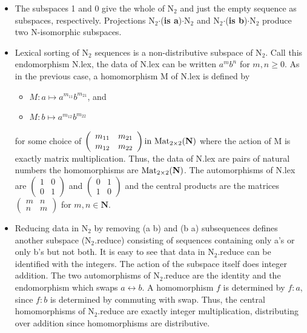 \documentclass[11pt]{article}
\begin{document}
\begin{itemize}
\item{The subspaces 1 and 0 give the whole of N$_2$ and just the empty sequence as subspaces, respectively.  
Projections N$_2$$\cdot$({\bf is a})$\cdot$N$_2$ and N$_2$$\cdot$({\bf is b})$\cdot$N$_2$ produce two N-isomorphic subspaces.}
\item{Lexical sorting of N$_2$ sequences is a non-distributive subspace of N$_2$.  Call this endomorphism N.lex, the data of N.lex 
can be written $a^m b^n$ for $m,n\ge 0$.  As in the previous case, a homomorphism M of N.lex is defined by  
\begin{itemize}
\item [] $M: a\mapsto a^{m_{11}} b^{m_{21}}$, and 
\item [] $M: b\mapsto a^{m_{12}} b^{m_{22}}$ 
\end{itemize}
for some choice of 
$
\left (
\begin{array}{cc} 
m_{11} & m_{21} \\ m_{12} & m_{22}  
\end{array}
\right ) 
{\rm in}\ {\rm Mat}_{2\times2}(\mathbf N)
$
where the action of M is exactly matrix multiplication.  Thus, the data of N.lex are pairs of natural numbers the 
homomorphisms are ${\rm Mat}_{2\times2}(\mathbf N)$.  The automorphisms of N.lex are 
$
\left (
\begin{array}{cc} 
1 & 0 \\ 0 & 1 
\end{array}
\right ) 
$
and 
$
\left (
\begin{array}{cc} 
0 & 1 \\ 1 & 0 
\end{array}
\right ) 
$
and the central products are the matrices 
$
\left (
\begin{array}{cc} 
m & n \\ n & m 
\end{array}
\right ) 
$
for $m,n\in\mathbf N$.


}
\item{Reducing data in N$_2$ by removing (a b) and (b a) subsequences defines another subspace (N$_2$.reduce) consisting of 
sequences containing only a's or only b's but not both.  It is easy to see that data in N$_2$.reduce can be identified with the 
integers.  The action of the subspace itself does integer addition.  
The two automorphisms of N$_2$.reduce are the identity and the endomorphism which 
swaps $a\leftrightarrow b$.  A homomorphism $f$ is determined by $f:a$, since $f:b$ is determined by commuting with swap. 
Thus, the central homomorphisms of N$_2$.reduce are exactly integer multiplication, distributing over addition since homomorphisms are 
distributive.  

} 
\end{itemize}
\end{document}

